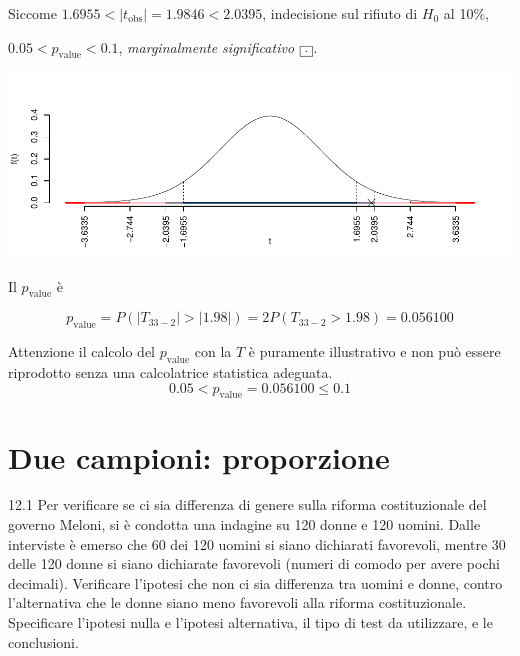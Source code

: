 \documentclass[
  11pt,
]{book}
\theoremstyle{mytheoremstyle}
\theoremstyle{mydefstyle}
\newenvironment{sol}
  {
  \begin{tcolorbox}[enhanced,breakable,arc=0.1mm,boxrule=1pt,colback=white,colframe=iblue,
  title=\bf \fontfamily{lmss}\selectfont \hspace{.5 cm} Soluzione,drop fuzzy shadow]

}{
\end{tcolorbox}
  }
\begin{document}
\begin{sol}
Siccome \(1.6955<|t_\text{obs}|=1.9846<2.0395\), indecisione sul rifiuto di \(H_0\) al 10\%,

\(0.05<p_\text{value}<0.1\), \emph{marginalmente significativo} \(\fbox{.}\).

\begin{center}\includegraphics{Esami_passati_con_soluzioni_files/figure-latex/05-test-15,-1} \end{center}

Il \(p_{\text{value}}\) è

\[ p_{\text{value}} = P(|T_{33-2}|>|1.98|)=2P(T_{33-2}>1.98)=0.056100 \]

Attenzione il calcolo del \(p_\text{value}\) con la \(T\) è puramente illustrativo e non può essere riprodotto senza una calcolatrice statistica adeguata.\[
 0.05 < p_\text{value}= 0.056100 \leq 0.1 
\]

\end{sol}

\section{Due campioni: proporzione}\label{due-campioni-proporzione}

12.1 Per verificare se ci sia differenza di genere sulla
riforma costituzionale del governo Meloni, si è condotta una
indagine su 120 donne e 120 uomini.
Dalle interviste è emerso che 60 dei 120 uomini si siano
dichiarati favorevoli, mentre 30 delle 120 donne si siano
dichiarate favorevoli (numeri di comodo per avere pochi decimali).
Verificare l'ipotesi
che non ci sia differenza tra uomini e donne, contro l'alternativa
che le donne siano meno favorevoli alla riforma costituzionale.
Specificare l'ipotesi nulla e l'ipotesi alternativa,
il tipo di test da utilizzare, e le conclusioni.
\end{document}

